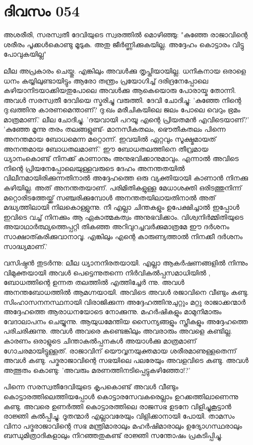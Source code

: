 \newpage
\section{ദിവസം 054}


അശരീരി, സരസ്വതീ ദേവിയുടെ സ്വരത്തില്‍ മൊഴിഞ്ഞു: "കുഞ്ഞേ രാജാവിന്റെ ശരീരം പൂക്കള്‍കൊണ്ടു മൂടുക. അതു ജീര്‍ണ്ണിക്കുകയില്ല. അദ്ദേഹം കൊട്ടാരം വിട്ടു പോവുകയില്ല"

ലീല അപ്രകാരം ചെയ്തു. എങ്കിലും അവള്‍ക്കു തൃപ്തിയായില്ല. ധനികനായ ഒരാളെ ധനം കയ്യിലുണ്ടായിട്ടും ആരോ തന്ത്രം പ്രയോഗിച്ച്‌ ദരിദ്രനേപ്പോലെ കഴിയാനിടയാക്കിയതുപോലെ അവള്‍ക്കു ആകെയൊരു പോരായ്മ തോന്നി. അവള്‍ സരസ്വതീ ദേവിയെ സ്മരിച്ചു വരുത്തി. ദേവി ചോദിച്ചു: 'കുഞ്ഞേ നിന്റെ ദു:ഖത്തിനു കാരണമെന്താണ്‌? ദു:ഖം മരീചികയിലെ ജലം പോലെ വെറും ഭ്രമം മാത്രമാണ്‌.'
ലീല ചോദിച്ചു. 'ദയവായി പറയൂ എന്റെ പ്രിയതമന്‍ എവിടെയാണ്‌?'
'കുഞ്ഞേ മൂന്നു തരം തലങ്ങളുണ്ട്‌- മാനസീകതലം, ഭൌതീകതലം പിന്നെ അനന്തമായ ബോധമെന്ന മറ്റൊന്ന്. ഇവയില്‍ ഏറ്റവും സൂക്ഷ്മമായത്‌ അനന്തമായ ബോധതലമാണ്‌.'  ഈ ബോധതലത്തിനെ തീവ്രമായ ധ്യാനംകൊണ്ട്‌ നിനക്ക്‌ കാണാനും അനുഭവിക്കാനുമാവും. എന്നാല്‍ അവിടെ നിന്റെ പ്രിയനേപ്പോലെയുള്ളവരുടെ ദേഹം അനന്തതയില്‍ വിലീനമായിരിക്കുന്നതിനാല്‍ അദ്ദേഹത്തെ ഒരു വ്യക്തിയായി കാണാന്‍ നിനക്കു കഴിയില്ല. അത്‌ അനന്തതയാണ്‌. പരിമിതികളുള്ള മേധാശക്തി ഒരിടത്തുനിന്ന് മറ്റൊരിടത്തേയ്ക്ക്‌ സഞ്ചരിക്കുമ്പോള്‍ അനന്തതയിലായതിനാല്‍ അത്‌ മദ്ധ്യത്തിലായി നിലകൊള്ളുന്നു. നീ എല്ലാ ചിന്തകളും ഉപേക്ഷിച്ചാല്‍ ഇപ്പോള്‍ ഇവിടെ വച്ച്‌ നിനക്കും ആ ഏകാത്മകത്വം അനുഭവിക്കാം. വിശ്വനിര്‍മ്മിതിയുടെ അയാഥാര്‍ത്ഥ്യത്തെപ്പറ്റി തികഞ്ഞ അറിവുറച്ചവര്‍ക്കുമാത്രമേ ഈ ദര്‍ശനം സാക്ഷാത്കരിക്കുവാനാവൂ. എങ്കിലും എന്റെ കാരുണ്യത്താല്‍ നിനക്കീ ദര്‍ശനം സാദ്ധ്യമാണ്‌.'

വസിഷ്ഠന്‍ തുടര്‍ന്നു: ലീല ധ്യാനനിരതയായി. എല്ലാ ആകര്‍ഷണങ്ങളില്‍ നിന്നും വിമുക്തയായി അവള്‍ പെട്ടെന്നുതന്നെ നിര്‍വികല്‍പ്പസമാധിയില്‍ , ബോധത്തിന്റെ ഉന്നത തലത്തില്‍ എത്തിച്ചേര്‍ ന്നു. അവള്‍ അനന്തബോധത്തില്‍ ആമഗ്നയായി. അവിടെ അവള്‍ രജാവിനെ വീണ്ടും കണ്ടു. സിംഹാസനനസ്ഥനായി വിരാജിക്കുന്ന അദ്ദേഹത്തിനുചുറ്റും മറ്റു രാജാക്കന്മാര്‍ അദ്ദേഹത്തെ ആരാധനയോടെ നോക്കുന്നു. മഹര്‍ഷികളും മാമുനിമാരും വേദാലാപനം ചെയ്യുന്നു. ആയുധമേന്തിയ സൈന്യങ്ങളും സ്ത്രീകളും അദ്ദേഹത്തെ പരിചരിക്കുന്നു. അവള്‍ അവരെ കണ്ടെങ്കിലും അവരാരും അവളെ കണ്ടില്ല. കാരണം ഒരാളുടെ ചിന്താകല്‍പ്പനകള്‍ അയാള്‍ക്കു മാത്രമാണ്‌ ഗോചരമായിട്ടുള്ളത്‌. രാജാവിന്‌ യൌവ്വനയുക്തമായ ശരീരമാണുള്ളതെന്ന് അവള്‍ കണ്ടു. പദ്മരാജാവിന്റെ സഭയിലെ പലരേയും അവളവിടെ കണ്ടു. അവള്‍ അത്ഭുതം കൊണ്ടു: 'അവരും മരണത്തിനടിപ്പെട്ടുകഴിഞ്ഞോ!?' 

പിന്നെ സരസ്വതീദേവിയുടെ കൃപകൊണ്ട്‌ അവള്‍ വീണ്ടും കൊട്ടാരത്തിലെത്തിയപ്പോള്‍ കൊട്ടാരസേവകരെല്ലാം ഉറക്കത്തിലാണെന്നു കണ്ടു. അവരെ ഉണര്‍ത്തി കൊട്ടാരത്തിലെ രാജസഭ ഉടനേ വിളിച്ചുകൂട്ടാന്‍ രാജ്ഞി കല്‍പ്പിച്ചു. ദൂതന്മാര്‍ എല്ലാവരേയും വിളിക്കാനായി പോയി. താമസം വിനാ പദ്മരാജാവിന്റെ സഭ മന്ത്രിമാരാലും മഹര്‍ഷിമാരാലും ഉദ്യോഗസ്ഥരാലും ബന്ധുമിത്രാദികളാലും നിറഞ്ഞതുകണ്ട്‌ രാജ്ഞി സന്തോഷം പ്രകടിപ്പിച്ചു.
